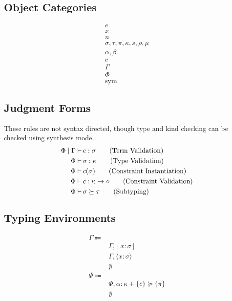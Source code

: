 \documentclass {article}
\begin{document}
\subsection{Object Categories}

\begin{align*}
e \tag{Terms} \\
x \tag{Variables} \\
n \tag{Numbers} \\
\sigma, \tau, \pi, \kappa, s, \rho, \mu \tag{Types, Kinds, etc} \\
\alpha, \beta \tag{Type and Kind Variables} \\
c \tag{Constraints} \\
\Gamma \tag{Type Environment} \\
\Phi \tag{Misc Environment} \\
\text{sym} \tag{Symbol}
\end{align*}


\subsection{Judgment Forms}
These rules are not syntax directed,
though type and kind checking can be checked using synthesis mode.
\begin{align*}
\Phi \mid \Gamma \vdash \, & e : \sigma \tag{\text{Term Validation}} \\
\Phi \vdash \, & \sigma : \kappa \tag{\text{Type Validation}} \\
\Phi \vdash \, &c (\sigma) \tag{Constraint Instantiation} \\
\Phi \vdash \, &c : \kappa \to \diamond \tag{Constraint Validation} \\
\Phi \vdash \, & \sigma \succeq \tau \tag{Subtyping}
\end{align*}

\subsection{Typing Environments}
\begin{align*}
\Gamma \Coloneqq & \\
& \Gamma, [x : \sigma] \\
& \Gamma, \langle x : \sigma \rangle \\
& \emptyset \\
\Phi \Coloneqq & \\
& \Phi, \alpha : \kappa + \{ \overline c \} \succeq \{ \overline \pi \} \\
& \emptyset \\
\end{align*}
\end{document}
